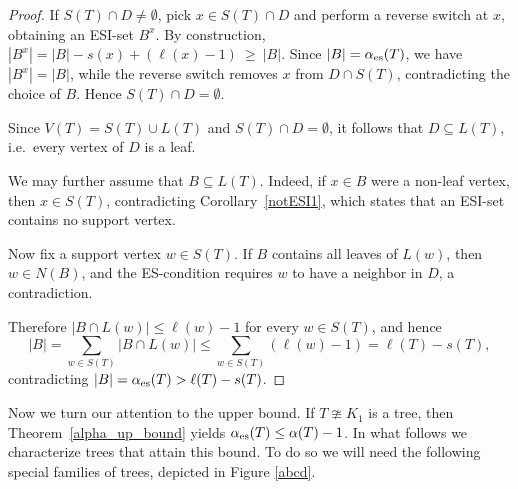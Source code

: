 \documentclass[11pt]{article}
\newcommand{\es}{\alpha_{\rm es}}
\begin{document}
\begin{proof}
If $S(T)\cap D\neq\emptyset$, pick $x\in S(T)\cap D$ and perform a reverse switch at $x$,
obtaining an ESI-set $B^{x}$. By construction,
$|B^{x}|=|B|-s(x)+(\ell(x)-1)\ \ge\ |B|$. Since $|B|=\es(T)$, we have $|B^{x}|=|B|$, while the reverse
switch removes $x$ from $D\cap S(T)$, contradicting the choice of $B$. Hence
$S(T)\cap D=\emptyset$.

Since $V(T)=S(T)\cup L(T)$ and $S(T)\cap D=\emptyset$, it follows that
$D\subseteq L(T)$, i.e.~every vertex of $D$ is a leaf.

We may further assume that $B\subseteq L(T)$. Indeed, if $x\in B$ were a non-leaf vertex, then $x\in S(T)$,
contradicting Corollary~\ref{notESI1}, which states that an ESI-set contains no support vertex.

Now fix a support vertex $w\in S(T)$. If $B$ contains all leaves of $L(w)$, then $w\in N(B)$,
and the ES-condition requires $w$ to have a neighbor in $D$, a contradiction.

Therefore $|B\cap L(w)|\le \ell(w)-1$ for every $w\in S(T)$, and hence
$$|B|
=\sum_{w\in S(T)}|B\cap L(w)|
\le \sum_{w\in S(T)}(\ell(w)-1)
=\ell(T)-s(T),$$
contradicting $|B|=\es(T)>\ell(T)-s(T)$. 
\end{proof}


\medskip

Now we turn our attention to the upper bound. If $T\ncong K_1$ is a tree, then Theorem~\ref{alpha_up_bound} yields $\es(T)\le \alpha(T)-1$. In what follows we characterize trees that attain this bound.
To do so we will need the following special families of trees,
depicted in Figure \ref{abcd}.
\end{document}
